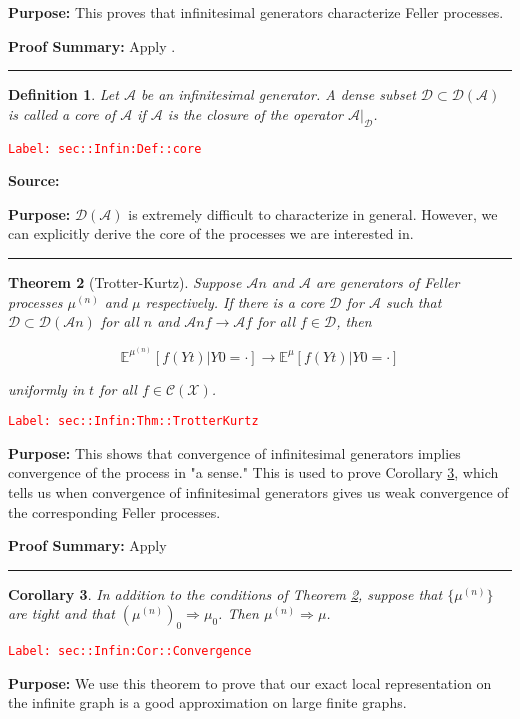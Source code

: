 \documentclass[12pt]{article}
\newcommand{\mb}{\mathbb}
\newcommand{\mc}{\mathcal}
\newcommand{\ra}{\rightarrow}
\newcommand{\tr}{\textcolor{red}}
\newcommand{\labe}[1]{\tr{\texttt{Label: #1}}}
\newcommand{\purpose}{\textbf{Purpose: }}
\newcommand{\pfsum}{\textbf{Proof Summary: }}
\newcommand{\lin}{\rule{\linewidth}{0.4 pt}}
\newcommand{\exmu}[2]{\mb{E}^{#1}\left[#2\right]}	%
\renewcommand{\t}{t}							%
\newcommand{\IG}{\mc{A}}						%
\newcommand{\ts}[1]{_{#1}}						%
\newcommand{\sln}[1]{^{(#1)}}						%
\newcommand{\core}{\mc{D}}						%
\newcommand{\cont}{\mc{C}}						%
\newcommand{\m}{\mu}							%
\newcommand{\XX}{Y}								%
\newcommand{\spce}{\mc{X}}						%
\newtheorem{thms}{Theorem}[section]
\newtheorem{coro}[thms]{Corollary}
\newtheorem{defn}[thms]{Definition}
\begin{document}
\purpose This proves that infinitesimal generators characterize Feller processes.

\pfsum Apply \cite[Theorem 1.5,2.9]{Lig85}.

\lin

\begin{defn}
Let \(\IG{}\) be an infinitesimal generator. A dense subset \(\core\subset \core(\IG{})\) is called a core of \(\IG{}\) if \(\IG{}\) is the closure of the operator \(\IG{}|_\core\).
\label{sec::Infin:Def::core}
\end{defn}
\labe{sec::Infin:Def::core}

\textbf{Source: }\cite[Definition 2.11]{Lig85}

\purpose \(\core(\IG{})\) is extremely difficult to characterize in general. However, we can explicitly derive the core of the processes we are interested in.

\lin

\begin{thms}[Trotter-Kurtz]
Suppose \(\IG{n}\) and \(\IG{}\) are generators of Feller processes \(\m\sln{n}\) and \(\m\) respectively. If there is a core \(\core\) for \(\IG{}\) such that \(\core \subset \mc{D}(\IG{n})\) for all \(n\) and \(\IG{n} f \ra \IG{} f\) for all \(f \in \core\), then 

\[\exmu{\m\sln{n}}{f(\XX{}{\t})|\XX{}{0}=\cdot} \ra \exmu{\mu}{f(\XX{}{\t})|\XX{}{0}=\cdot}\]

uniformly in \(\t\) for all \(f \in \cont(\spce)\).
\label{sec::Infin:Thm::TrotterKurtz}
\end{thms}
\labe{sec::Infin:Thm::TrotterKurtz}

\purpose This shows that convergence of infinitesimal generators implies convergence of the process in "a sense." This is used to prove Corollary \ref{sec::Infin:Cor::Convergence}, which tells us when convergence of infinitesimal generators gives us weak convergence of the corresponding Feller processes.

\pfsum Apply \cite[Theorem 2.12]{Lig85}

\lin

\begin{coro}
In addition to the conditions of Theorem \ref{sec::Infin:Thm::TrotterKurtz}, suppose that \(\{\m\sln{n}\}\) are tight and that \((\m\sln{n})\ts{0} \Rightarrow \m\ts{0}\). Then \(\m\sln{n} \Rightarrow \m\).
\label{sec::Infin:Cor::Convergence}
\end{coro}
\labe{sec::Infin:Cor::Convergence}

\purpose We use this theorem to prove that our exact local representation on the infinite graph is a good approximation on large finite graphs.
\end{document}
